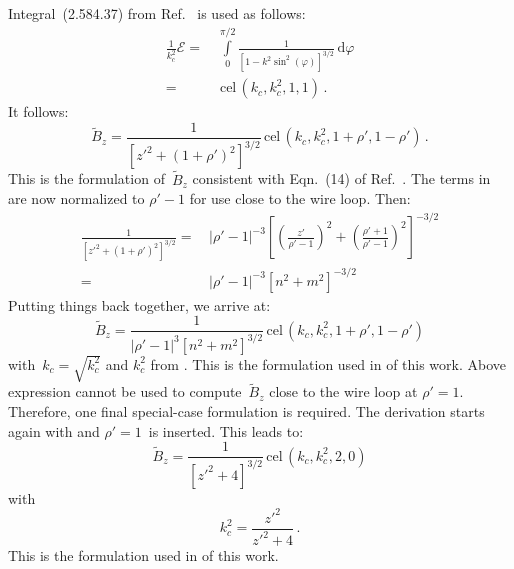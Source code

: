 Integral~(2.584.37) from Ref.~\cite{gradshteyn_ryzhik} is used as follows:
\begin{align}
  \frac{1}{k_c^2} \mathcal{E}
 =&\, \int\limits_0^{\pi/2}
        \frac{1}{\left[ 1 - k^2 \sin^2(\varphi) \right]^{3/2}}
        \,\mathrm{d}\varphi \nonumber \\
 =&\, \,\textrm{cel}\,(k_c, k_c^2, 1, 1) \, .
\end{align}
It follows:
\begin{equation}
  \tilde{B}_z
 = \frac{1}{\left[z'^2 + (1 + \rho')^2\right]^{3/2}} \,\textrm{cel}\,(k_c, k_c^2, 1 + \rho', 1 - \rho') \, . \label{eqn:cwl_B_z_14}
\end{equation}
This is the formulation of~$\tilde{B}_z$ consistent with Eqn.~(14) of Ref.~\cite{walstrom_2017}.
The terms in~ are now normalized to $\rho'-1$ for use close to the wire loop.
Then:
\begin{align}
  \frac{1}{\left[z'^2 + (1 + \rho')^2\right]^{3/2}}
 =&\, \left| \rho' - 1 \right|^{-3} \left[ \left(\frac{z'}{\rho'-1}\right)^2 + \left( \frac{\rho' + 1}{\rho'-1} \right)^2 \right]^{-3/2} \nonumber \\
 =&\, \left| \rho' - 1 \right|^{-3} \left[ n^2 + m^2 \right]^{-3/2}
\end{align}
Putting things back together, we arrive at:
\begin{equation}
  \tilde{B}_z
 = \frac{1}{\left| \rho' - 1 \right|^3 \left[ n^2 + m^2 \right]^{3/2} } \,\textrm{cel}\,(k_c, k_c^2, 1 + \rho', 1 - \rho')
\end{equation}
with~$k_c = \sqrt{k_c^2}$ and $k_c^2$ from .
This is the formulation used in  of this work.
Above expression cannot be used to compute~$\tilde{B}_z$ close to the wire loop at $\rho'=1$.
Therefore, one final special-case formulation is required.
The derivation starts again with  and $\rho'=1$~is inserted.
This leads to:
\begin{equation}
  \tilde{B}_z = \frac{1}{\left[ z'^2 + 4 \right]^{3/2}} \,\textrm{cel}\,(k_c, k_c^2, 2, 0)
\end{equation}
with
\begin{equation}
  k_c^2 = \frac{z'^2}{z'^2 + 4} \, .
\end{equation}
This is the formulation used in  of this work.

